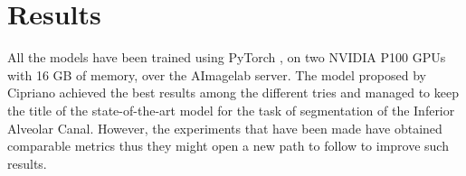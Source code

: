 \section{Results}
All the models have been trained using PyTorch \cite{paszke2019pytorch}, on two
NVIDIA P100 GPUs with 16 GB of memory, over the AImagelab server.
The model proposed by Cipriano \etal achieved the best results among the
different tries and managed to keep the title of the state-of-the-art model for
the task of segmentation of the Inferior Alveolar Canal. However, the
experiments that have been made have obtained comparable metrics thus they might
open a new path to follow to improve such results.

